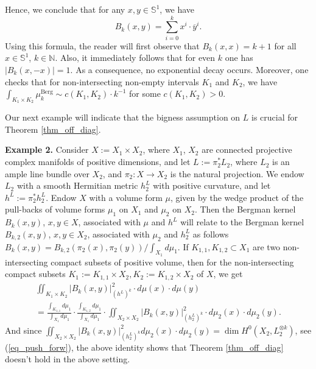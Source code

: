 \documentclass[12pt]{article}
\numberwithin{equation}{section}
\theoremstyle{theorem}
\theoremstyle{definition}
\theoremstyle{remark}
\begin{document}
	Hence, we conclude that for any $x, y \in \mathbb{S}^1$, we have
	\begin{equation}
		B_k(x, y) = \sum_{i = 0}^{k} x^i \cdot \overline{y}^i.
	\end{equation}
	Using this formula, the reader will first observe that $B_k(x, x) = k + 1$ for all $x \in \mathbb{S}^1$, $k \in \mathbb{N}$. 
	Also, it immediately follows that for even $k$ one has $|B_k(x, -x)| = 1$. 
	As a consequence, no exponential decay occurs.  
	Moreover, one checks that for non-intersecting non-empty intervals $K_1$ and $K_2$, we have $\int_{K_1 \times K_2} \mu_k^{\mathrm{Berg}} \sim c(K_1, K_2) \cdot k^{-1}$ for some $c(K_1, K_2) > 0$.
	\par 
	Our next example will indicate that the bigness assumption on $L$ is crucial for Theorem \ref{thm_off_diag}.
	\par 
	\textbf{Example 2.}
	Consider $X := X_1 \times X_2$, where $X_1$, $X_2$ are connected projective complex manifolds of positive dimensions, and let $L := \pi_2^* L_2$, where $L_2$ is an ample line bundle over $X_2$, and $\pi_2 : X \to X_2$ is the natural projection.
	We endow $L_2$ with a smooth Hermitian metric $h^L_2$ with positive curvature, and let $h^L := \pi_2^* h^L_2$.
	Endow $X$ with a volume form $\mu$, given by the wedge product of the pull-backs of volume forms $\mu_1$ on $X_1$ and $\mu_2$ on $X_2$.
	Then the Bergman kernel $B_k(x, y)$, $x , y \in X$, associated with $\mu$ and $h^L$ will relate to the Bergman kernel $B_{k, 2}(x, y)$, $x , y \in X_2$, associated with $\mu_2$ and $h^L_2$ as follows $B_k(x, y) = B_{k, 2}(\pi_2(x), \pi_2(y)) / \int_{X_1} d \mu_1$.
	If $K_{1, 1}, K_{1, 2} \subset X_1$ are two non-intersecting compact subsets of positive volume, then for the non-intersecting compact subsets $K_1 := K_{1, 1} \times X_2, K_2 := K_{1, 2} \times X_2$ of $X$, we get 
	\begin{multline}
		\iint_{K_1 \times K_2} |B_k(x, y)|^2_{(h^L)^k} \cdot d \mu(x) \cdot d \mu (y)
		\\
		=
	 	\frac{\int_{K_{1, 1}} d \mu_1}{\int_{X_1} d \mu_1}
	 	\cdot
	 	\frac{\int_{K_{1, 2}} d \mu_1}{\int_{X_1} d \mu_1}
	 	\cdot
	 	\iint_{X_2 \times X_2} |B_k(x, y)|^2_{(h^L_2)^k} \cdot d \mu_2 (x) \cdot d \mu_2 (y).
	\end{multline}
	And since $\iint_{X_2 \times X_2} |B_k(x, y)|^2_{(h^L_2)^k} d \mu_2 (x) \cdot d \mu_2 (y) = \dim H^0(X_2, L_2^{\otimes k})$, see (\ref{eq_push_forw}), the above identity shows that Theorem \ref{thm_off_diag} doesn't hold in the above setting.
	\par 
\end{document}
